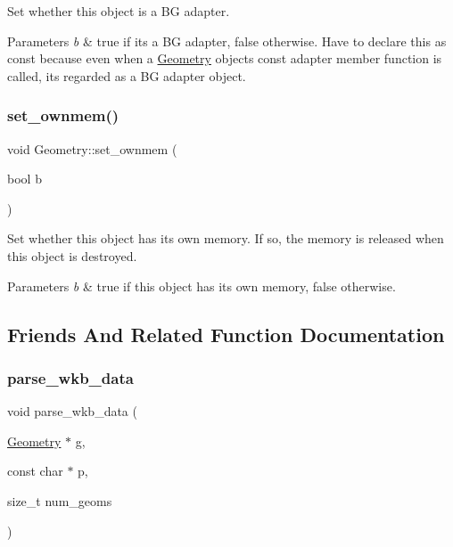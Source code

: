 Set whether this object is a BG adapter. 
\begin{DoxyParams}{Parameters}
{\em b} & true if it\textquotesingle{}s a BG adapter, false otherwise. Have to declare this as const because even when a \mbox{\hyperlink{classGeometry}{Geometry}} object\textquotesingle{}s const adapter member function is called, it\textquotesingle{}s regarded as a BG adapter object. \\
\hline
\end{DoxyParams}
\mbox{\label{classGeometry_a1037b25eaa5591e899843ed79519b543}} 
\subsubsection{\texorpdfstring{set\+\_\+ownmem()}{set\_ownmem()}}
{\footnotesize\ttfamily void Geometry\+::set\+\_\+ownmem (\begin{DoxyParamCaption}\item[{bool}]{b }\end{DoxyParamCaption})\hspace{0.3cm}{\ttfamily [inline]}}

Set whether this object has its own memory. If so, the memory is released when this object is destroyed. 
\begin{DoxyParams}{Parameters}
{\em b} & true if this object has its own memory, false otherwise. \\
\hline
\end{DoxyParams}


\subsection{Friends And Related Function Documentation}
\mbox{\label{classGeometry_af4cc4635baabc8496089c8359f5a305f}} 
\subsubsection{\texorpdfstring{parse\+\_\+wkb\+\_\+data}{parse\_wkb\_data}}
{\footnotesize\ttfamily void parse\+\_\+wkb\+\_\+data (\begin{DoxyParamCaption}\item[{\mbox{\hyperlink{classGeometry}{Geometry}} $\ast$}]{g,  }\item[{const char $\ast$}]{p,  }\item[{size\+\_\+t}]{num\+\_\+geoms }\end{DoxyParamCaption})\hspace{0.3cm}{\ttfamily [friend]}}

